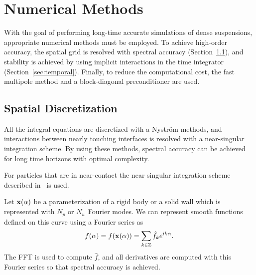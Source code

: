 \documentclass[preprint, 10pt]{elsarticle}
\begin{document}
		
\section{Numerical Methods\label{s:method}} 
With the goal of performing long-time accurate simulations of dense
suspensions, appropriate numerical methods must be employed.  To achieve
high-order accuracy, the spatial grid is resolved with spectral accuracy
(Section~\ref{sec:spatial}), and stability is achieved by using implicit
interactions in the time integrator (Section~\ref{sec:temporal}).  Finally, to
reduce the computational cost, the fast multipole method and a
block-diagonal preconditioner are used.


\subsection{Spatial Discretization}\label{sec:spatial}
 All the integral equations are discretized
with a Nystr\"om  methods, and interactions between nearly touching
interfaces is resolved with a near-singular integration scheme. By using
these methods, spectral accuracy can be achieved for long time horizons
with optimal complexity.

For particles that are in near-contact the near singular
integration scheme described in~\cite{Quaife2014, Ying2006} is used.

Let ${\mathbf{x}}(\alpha)$ be a parameterization of a rigid body or a solid
wall which is represented with $N_p$ or $N_w$ Fourier modes. We can represent smooth functions defined on this curve using a
Fourier series as
\begin{align}
  f(\alpha) = f({\mathbf{x}}(\alpha)) = \sum_{k \in {\mathbb{Z}}} \hat{f}_k e^{ik\alpha}.
\end{align}
The FFT is used to compute $\hat{f}$, and all derivatives are computed
with this Fourier series so that spectral accuracy is achieved.
\end{document}
